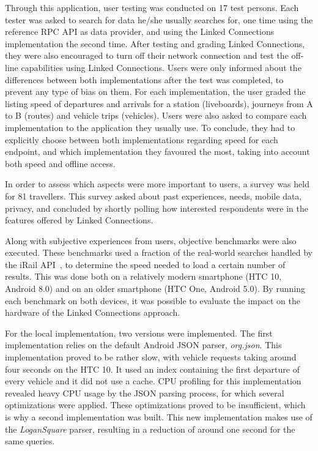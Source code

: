 \documentclass[twocolumn]{phdsymp} %
\begin{document}
Through this application, user testing was conducted on 17 test persons. Each tester was asked to search for data he/she usually searches for, one time using the reference RPC API as data provider, and using the Linked Connections implementation the second time. After testing and grading Linked Connections, they were also encouraged to turn off their network connection and test the off-line capabilities using Linked Connections. Users were only informed about the differences between both implementations after the test was completed, to prevent any type of bias on them. For each implementation, the user graded the listing speed of departures and arrivals for a station (liveboards), journeys from A to B (routes) and vehicle trips (vehicles). Users were also asked to compare each implementation to the application they usually use. To conclude, they had to explicitly choose between both implementations regarding speed for each endpoint, and which implementation they favoured the most, taking into account both speed and offline access.

In order to assess which aspects were more important to users, a survey was held for 81 travellers. This survey asked about past experiences, needs, mobile data, privacy, and concluded by shortly polling how interested respondents were in the features offered by Linked Connections.

Along with subjective experiences from users, objective benchmarks were also executed. These benchmarks used a fraction of the real-world searches handled by the iRail API~\cite{irailbe}, to determine the speed needed to load a certain number of results. This was done both on a relatively modern smartphone (HTC 10, Android 8.0) and on an older smartphone (HTC One, Android 5.0). By running each benchmark on both devices, it was possible to evaluate the impact on the hardware of the Linked Connections approach.

For the local implementation, two versions were implemented. The first implementation relies on the default Android JSON parser, \emph{org.json}. This implementation proved to be rather slow, with vehicle requests taking around four seconds on the HTC 10. It used an index containing the first departure of every vehicle and it did not use a cache. CPU profiling for this implementation revealed heavy CPU usage by the JSON parsing process, for which several optimizations were applied. These optimizations proved to be insufficient, which is why a second implementation was built. This new implementation makes use of the \emph{LoganSquare} parser, resulting in a reduction of around one second for the same queries.
\end{document}
